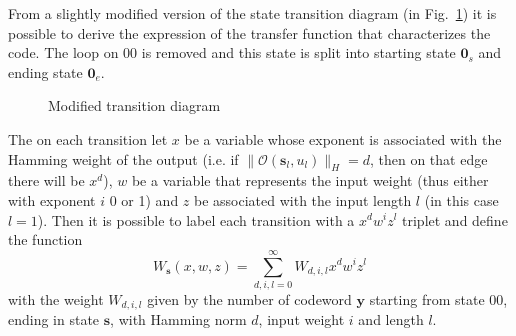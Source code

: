 \documentclass[10pt]{article}
\newcommand{\outf}[1] {\mathcal{O}(#1)}
\newcommand{\s} {\mathbf{s}}
\begin{document}
From a slightly modified version of the state transition diagram (in Fig.~\ref{fig:state_t}) it is possible to derive the expression of the transfer function that characterizes the code. The loop on $00$ is removed and this state is split into starting state $\mathbf{0}_s$ and ending state $\mathbf{0}_e$.

\begin{figure}
\centering
{}
\caption{Modified transition diagram}
\label{fig:state_t}
\end{figure}

The on each transition let $x$ be a variable whose exponent is associated with the Hamming weight of the output (i.e. if $\|\outf{\s_l, u_l}\|_H = d$, then on that edge there will be $x^d$), $w$ be a variable that represents the input weight (thus either with exponent $i$ 0 or 1) and $z$ be associated with the input length $l$ (in this case $l=1$). Then it is possible to label each transition with a $x^dw^iz^l$ triplet and define the function
\begin{equation}
	W_{\mathbf{s}}(x, w, z) = \sum_{d, i, l = 0}^{\infty}W_{d, i, l} x^dw^iz^l
\end{equation}
with the weight $W_{d, i, l}$ given by the number of codeword $\mathbf{y}$ starting from state $00$, ending in state $\mathbf{s}$, with Hamming norm $d$, input weight $i$ and length $l$. 
\end{document}
